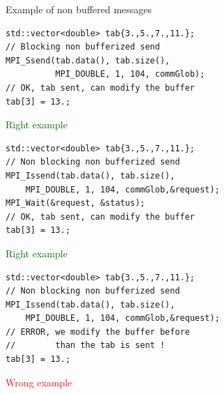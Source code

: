 \documentclass[compress,10pt,aspectratio=169]{beamer}
\begin{document}
\begin{frame}[fragile]{Example of non buffered messages}
    \begin{multicols}{2}
\begin{mdframed}[backgroundcolor=green!20]
\begin{minipage}{0.45\textwidth}
\begin{verbatim}
std::vector<double> tab{3.,5.,7.,11.};
// Blocking non bufferized send
MPI_Ssend(tab.data(), tab.size(), 
          MPI_DOUBLE, 1, 104, commGlob);
// OK, tab sent, can modify the buffer
tab[3] = 13.;
\end{verbatim}
\textcolor{DarkGreen}{\small Right example}
\end{minipage}
\end{mdframed}
\begin{mdframed}[backgroundcolor=green!20]
\begin{minipage}{0.45\textwidth}
\begin{verbatim}
std::vector<double> tab{3.,5.,7.,11.};
// Non blocking non bufferized send
MPI_Issend(tab.data(), tab.size(), 
    MPI_DOUBLE, 1, 104, commGlob,&request);
MPI_Wait(&request, &status);
// OK, tab sent, can modify the buffer
tab[3] = 13.;
\end{verbatim}
\textcolor{DarkGreen}{\small Right example}
\end{minipage}
\end{mdframed}
\columnbreak
\begin{mdframed}[backgroundcolor=red!20]
\begin{minipage}{0.45\textwidth}
\begin{verbatim}
std::vector<double> tab{3.,5.,7.,11.};
// Non blocking non bufferized send
MPI_Issend(tab.data(), tab.size(), 
    MPI_DOUBLE, 1, 104, commGlob,&request);
// ERROR, we modify the buffer before
//        than the tab is sent !
tab[3] = 13.;
\end{verbatim}
\textcolor{red}{\small Wrong example}
\end{minipage}
\end{mdframed}
\end{multicols}
\end{frame}
\end{document}
